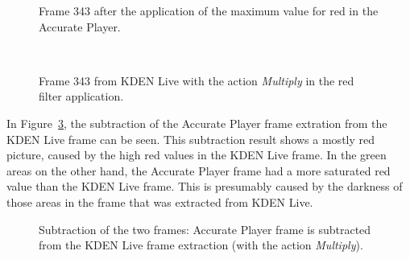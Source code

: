 \documentclass[../MasterThesis.tex]{subfiles}
\begin{document}
\begin{minipage}{0.48\textwidth}
	\begin{figure}[H]
		\begin{center}
			\caption[Frame 343 after the application of the red filter in the Accurate Player.]{Frame 343 after the application of the maximum value for red in the Accurate Player.}
			\label{figure:APframe3}
		\end{center}
	\end{figure}
\end{minipage}\begin{minipage}{0.04\textwidth}
	\ 
\end{minipage}\begin{minipage}{0.48\textwidth}
	\begin{figure}[H]
		\begin{center}
			\caption[Frame 343 from KDEN Live with the action \textit{Multiply}.]{Frame 343 from KDEN Live with the action \textit{Multiply} in the red filter application.}
			\label{figure:multiply}
		\end{center}
	\end{figure}
\end{minipage}
\vspace*{1em}

In Figure~\ref{figure:multiplygimp}, the subtraction of the Accurate Player frame extration from the KDEN Live frame can be seen. This subtraction result shows a mostly red picture, caused by the high red values in the KDEN Live frame. In the green areas on the other hand, the Accurate Player frame had a more saturated red value than the KDEN Live frame. This is presumably caused by the darkness of those areas in the frame that was extracted from KDEN Live.



\begin{figure}[H]
	\begin{center}
		\caption[Subtraction of KDEN Live (\textit{Multiply} and Accurate Player).]{Subtraction of the two frames: Accurate Player frame is subtracted from the KDEN Live frame extraction (with the action \textit{Multiply}).}
		\label{figure:multiplygimp}
	\end{center}
\end{figure}
\end{document}
